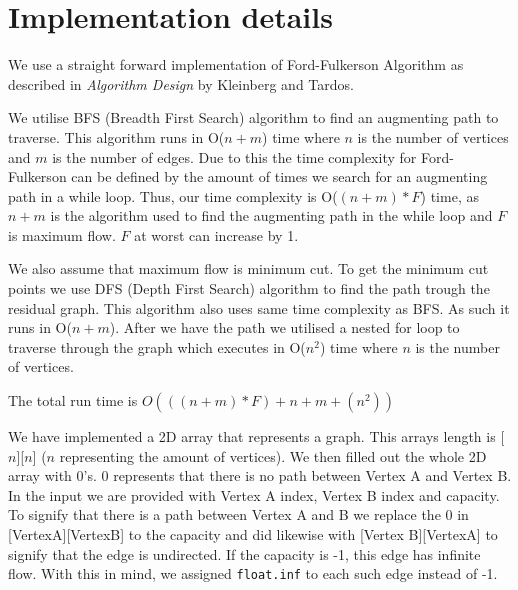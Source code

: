 \documentclass{article}
\begin{document}
  \section{Implementation details}

  We use a straight forward implementation of Ford-Fulkerson Algorithm as described in \emph{Algorithm Design} by Kleinberg and Tardos. \vspace{2.5mm} %
  
  \noindent  We utilise BFS (Breadth First Search) algorithm to find an augmenting path to traverse. This algorithm runs in O($n+m$) time where $n$ is the number of vertices and $m$ is the number of edges.
  Due to this the time complexity for Ford-Fulkerson can be defined by the amount of times we search for an augmenting path in a while loop. Thus, our time complexity is O($(n+m) * F$) time, as $n+m$ is the algorithm used to find the augmenting path in the while loop and $F$ is maximum flow.
  $F$ at worst can increase by 1.  \vspace{5mm} %

  \noindent We also assume that maximum flow is minimum cut. 
  To get the minimum cut points we use DFS (Depth First Search) algorithm to find the path trough the residual graph. This algorithm also uses same time complexity as BFS. As such it runs in O($n+m$).
  After we have the path we utilised a nested for loop to traverse through the graph which executes in O(\(  n^2 \)) time where $n$ is the number of vertices.  \vspace{5mm} %

\begin{center}
  The total run time is $O(((n+m) * F) + n+m +  (  n^2 ) )$  \\
\end{center}
  
\vspace{5mm} %
  \noindent We have implemented a 2D array that represents a graph. This arrays length is [$n$][$n$] ($n$ representing the amount of vertices). 
  We then filled out the whole 2D array with 0's. 0 represents that there is no path between Vertex A and Vertex B. In the input we are provided with Vertex A index, Vertex B index and capacity. To signify that there is a path between Vertex A and B we replace the 0 in [VertexA][VertexB] to the capacity and did likewise with [Vertex B][VertexA] to signify that the edge is undirected.
  If the capacity is -1, this edge has infinite flow. With this in mind, we assigned \texttt{float.inf} to each such edge instead of -1.  \vspace{5mm} %
\end{document}
